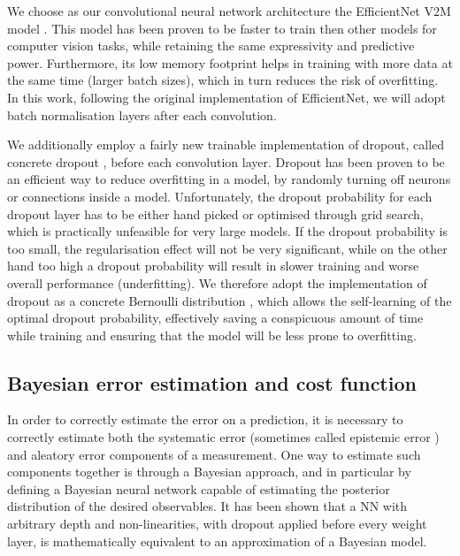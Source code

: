 We choose as our convolutional neural network architecture the EfficientNet V2M model \cite{efficient-net-v2}. This model has been proven to be faster to train then other models for computer vision tasks, while retaining the same expressivity and predictive power. 
Furthermore, its low memory footprint helps in training with more data at the same time (larger batch sizes), which in turn reduces the risk of overfitting.
In this work, following the original implementation of EfficientNet, we will adopt batch normalisation layers after each convolution.

We additionally employ a fairly new trainable implementation of dropout, called concrete dropout \cite{concrete-dropout}, before each convolution layer.
Dropout \cite{dropout} has been proven to be an efficient way to reduce overfitting in a model, by randomly turning off neurons or connections inside a model. Unfortunately, the dropout probability for each dropout layer has to be either hand picked or optimised through grid search, which is practically unfeasible for very large models. If the dropout probability is too small, the regularisation effect will not be very significant, while on the other hand too high a dropout probability will result in slower training and worse overall performance (underfitting). 
We therefore adopt the implementation of dropout as a concrete Bernoulli distribution \cite{concrete-distribution}, which allows the self-learning of the optimal dropout probability, effectively saving a conspicuous amount of time while training and ensuring that the model will be less prone to overfitting. 




\subsection{Bayesian error estimation and cost function}
\label{sec:bayesian-error}


In order to correctly estimate the error on a prediction, it is necessary to correctly estimate both the systematic error (sometimes called epistemic error \cite{epistemic-err}) and aleatory error components of a measurement. One way to estimate such components together is through a Bayesian approach, and in particular by defining a Bayesian neural network capable of estimating the posterior distribution of the desired observables.   
It has been shown \cite{mcdropout} 
that a NN with arbitrary depth and  non-linearities, with dropout applied before every weight layer, is mathematically equivalent to an approximation of a Bayesian model. 

